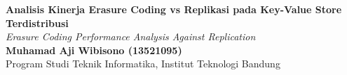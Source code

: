 \documentclass[a2,portrait]{config/poster/a0poster}
\begin{document}

\begin{minipage}[c]{\linewidth}
\Huge \textbf{Analisis Kinerja Erasure Coding vs Replikasi pada Key-Value Store Terdistribusi} \\
\large \textit{Erasure Coding Performance Analysis Against Replication} \\
\normalsize \textbf{Muhamad Aji Wibisono (13521095)} \\
\normalsize Program Studi Teknik Informatika, Institut Teknologi Bandung \\
\end{minipage}

\vspace{0.05cm} %

\end{document}
